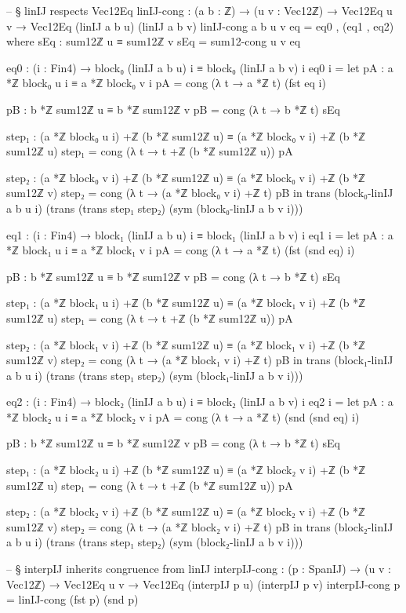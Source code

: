 \documentclass[11pt,a4paper]{book}
\begin{document}
\begin{code}
-- § linIJ respects Vec12Eq
linIJ-cong : (a b : ℤ) → (u v : Vec12ℤ) → Vec12Eq u v → Vec12Eq (linIJ a b u) (linIJ a b v)
linIJ-cong a b u v eq = eq0 , (eq1 , eq2)
  where
    sEq : sum12ℤ u ≡ sum12ℤ v
    sEq = sum12-cong u v eq

    eq0 : (i : Fin4) → block₀ (linIJ a b u) i ≡ block₀ (linIJ a b v) i
    eq0 i =
      let
        pA : a *ℤ block₀ u i ≡ a *ℤ block₀ v i
        pA = cong (λ t → a *ℤ t) (fst eq i)

        pB : b *ℤ sum12ℤ u ≡ b *ℤ sum12ℤ v
        pB = cong (λ t → b *ℤ t) sEq

        step₁ : (a *ℤ block₀ u i) +ℤ (b *ℤ sum12ℤ u) ≡ (a *ℤ block₀ v i) +ℤ (b *ℤ sum12ℤ u)
        step₁ = cong (λ t → t +ℤ (b *ℤ sum12ℤ u)) pA

        step₂ : (a *ℤ block₀ v i) +ℤ (b *ℤ sum12ℤ u) ≡ (a *ℤ block₀ v i) +ℤ (b *ℤ sum12ℤ v)
        step₂ = cong (λ t → (a *ℤ block₀ v i) +ℤ t) pB
      in
      trans
        (block₀-linIJ a b u i)
        (trans (trans step₁ step₂) (sym (block₀-linIJ a b v i)))

    eq1 : (i : Fin4) → block₁ (linIJ a b u) i ≡ block₁ (linIJ a b v) i
    eq1 i =
      let
        pA : a *ℤ block₁ u i ≡ a *ℤ block₁ v i
        pA = cong (λ t → a *ℤ t) (fst (snd eq) i)

        pB : b *ℤ sum12ℤ u ≡ b *ℤ sum12ℤ v
        pB = cong (λ t → b *ℤ t) sEq

        step₁ : (a *ℤ block₁ u i) +ℤ (b *ℤ sum12ℤ u) ≡ (a *ℤ block₁ v i) +ℤ (b *ℤ sum12ℤ u)
        step₁ = cong (λ t → t +ℤ (b *ℤ sum12ℤ u)) pA

        step₂ : (a *ℤ block₁ v i) +ℤ (b *ℤ sum12ℤ u) ≡ (a *ℤ block₁ v i) +ℤ (b *ℤ sum12ℤ v)
        step₂ = cong (λ t → (a *ℤ block₁ v i) +ℤ t) pB
      in
      trans
        (block₁-linIJ a b u i)
        (trans (trans step₁ step₂) (sym (block₁-linIJ a b v i)))

    eq2 : (i : Fin4) → block₂ (linIJ a b u) i ≡ block₂ (linIJ a b v) i
    eq2 i =
      let
        pA : a *ℤ block₂ u i ≡ a *ℤ block₂ v i
        pA = cong (λ t → a *ℤ t) (snd (snd eq) i)

        pB : b *ℤ sum12ℤ u ≡ b *ℤ sum12ℤ v
        pB = cong (λ t → b *ℤ t) sEq

        step₁ : (a *ℤ block₂ u i) +ℤ (b *ℤ sum12ℤ u) ≡ (a *ℤ block₂ v i) +ℤ (b *ℤ sum12ℤ u)
        step₁ = cong (λ t → t +ℤ (b *ℤ sum12ℤ u)) pA

        step₂ : (a *ℤ block₂ v i) +ℤ (b *ℤ sum12ℤ u) ≡ (a *ℤ block₂ v i) +ℤ (b *ℤ sum12ℤ v)
        step₂ = cong (λ t → (a *ℤ block₂ v i) +ℤ t) pB
      in
      trans
        (block₂-linIJ a b u i)
        (trans (trans step₁ step₂) (sym (block₂-linIJ a b v i)))

-- § interpIJ inherits congruence from linIJ
interpIJ-cong : (p : SpanIJ) → (u v : Vec12ℤ) → Vec12Eq u v → Vec12Eq (interpIJ p u) (interpIJ p v)
interpIJ-cong p = linIJ-cong (fst p) (snd p)
\end{code}
\end{document}
